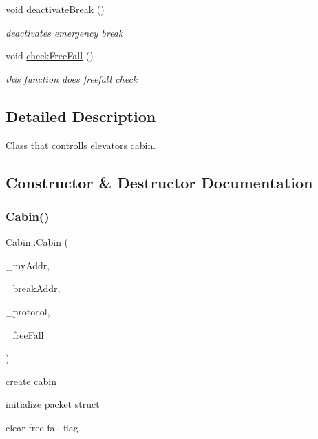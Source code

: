\begin{DoxyCompactItemize}
\mbox{\label{classCabin_a64f983cf6cd6c7561123de8c1127946a}} 
void \hyperlink{classCabin_a64f983cf6cd6c7561123de8c1127946a}{deactivate\+Break} ()
\begin{DoxyCompactList}\small\item\em deactivates emergency break \end{DoxyCompactList}\item 
void \hyperlink{classCabin_a9ed9525eb20ca2140e190375f0baba21}{check\+Free\+Fall} ()
\begin{DoxyCompactList}\small\item\em this function does freefall check \end{DoxyCompactList}\end{DoxyCompactItemize}


\subsection{Detailed Description}
Class that controlls elevator\textquotesingle{}s cabin. 

\subsection{Constructor \& Destructor Documentation}
\mbox{\label{classCabin_ad1fcd1dd96414aa2c529bd13156d37b3}} 
\subsubsection{\texorpdfstring{Cabin()}{Cabin()}}
{\footnotesize\ttfamily Cabin\+::\+Cabin (\begin{DoxyParamCaption}\item[{uint8\+\_\+t}]{\+\_\+my\+Addr,  }\item[{uint8\+\_\+t}]{\+\_\+break\+Addr,  }\item[{\hyperlink{classProtocol}{Protocol} $\ast$}]{\+\_\+protocol,  }\item[{Interrupt\+In $\ast$}]{\+\_\+free\+Fall }\end{DoxyParamCaption})\hspace{0.3cm}{\ttfamily [inline]}}



create cabin 

initialize packet struct

clear free fall flag

